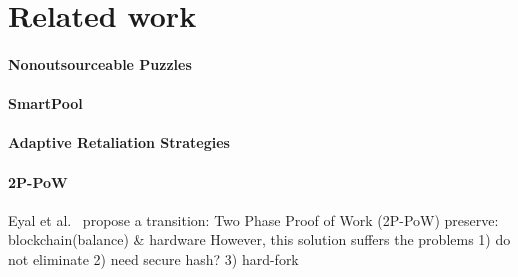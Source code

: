 \section{Related work}


\paragraph{Nonoutsourceable Puzzles}

\paragraph{SmartPool}

\paragraph{Adaptive Retaliation Strategies}

\paragraph{2P-PoW}
Eyal et al.~\cite{2P-PoW} propose a 
transition: 
Two Phase Proof of Work (2P-PoW)
preserve: blockchain(balance) & hardware
However,
this solution suffers the problems 
1) do not eliminate
2) need secure hash?
3) hard-fork

